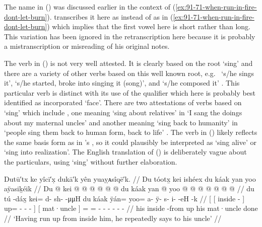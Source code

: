 The name  in (\lastx) was discussed earlier in the context of (\ref{ex:91-71-when-run-in-fire-dont-let-burn}).
\citeauthor{swanton:1909} transcribes it here as  instead of  as in (\ref{ex:91-71-when-run-in-fire-dont-let-burn}) which implies that the first vowel here is short rather than long.
This variation has been ignored in the retranscription here because it is probably a mistranscription or misreading of his original notes.

The verb in (\lastx) is not very well attested.
It is clearly based on the root  ‘sing’ and there are a variety of other verbs based on this well known root, e.g.\  ‘s/he sings it’,  ‘s/he started, broke into singing it (song)’, and  ‘s/he composed it’ \parencites[10/54–57]{leer:1973}.
This particular verb is distinct with its use of the  qualifier which here is probably best identified as incorporated  ‘face’.
There are two attestations of verbs based on  ‘sing’ which include , one meaning ‘sing about relatives’ in  ‘I sang the doings about my maternal uncles’ \parencite[191.2654]{story-naish:1973} and another meaning ‘sing back to humanity’ in  ‘people sing them back to human form, back to life’ \parencites[10/57]{leer:1973}[542]{leer:1976}.
The verb in (\lastx) likely reflects the same basis form as in \citeauthor{leer:1973}’s , so it could plausibly be interpreted as ‘sing alive’ or ‘sing into realization’.
The English translation of (\lastx) is deliberately vague about the particulars, using ‘sing’ without further elaboration.

\ex\label{ex:91-86-run-up-from-inside-repeatedly-say-to-uncle}%
%
\begingl
	\glpreamble	Dutū′tx ke yîcī′x̣ dukā′k yên yuaỵᴀsîqē′k. //
	\glpreamble	Du tóotx̱ kei ishéex du káak yan yoo aÿasiḵéik //
	\gla	{} {} Du  @ {} {}
			kei @  @ {} @ {} @ {} @ {} @ {} {}
		{} du káak {}
		yan @ yoo @  @ {} @ {} @ {} @ {} @ {} @ {} //
	\glb	{} {} du tú -dáx̱ {}
			kei= {} d- sh-  -μμH {} {}
		{} du káak {}
		ÿán= yoo= a- ÿ- s- i-  -eH -k //
	\glc	{}[ {}[  inside - {}]
			up= \· - -  - \· {}]
		{}[  mat·uncle {}]
		= = - - - -  - - //
	\gld	{} {} his inside -from {}
			up  {} {} {} {} {} {}
		{} his mat·uncle {}
		done\•   {} {} {} {} {} //
	\glft	‘Having run up from inside him, he repeatedly says to his uncle’
		//
\endgl
\xe

